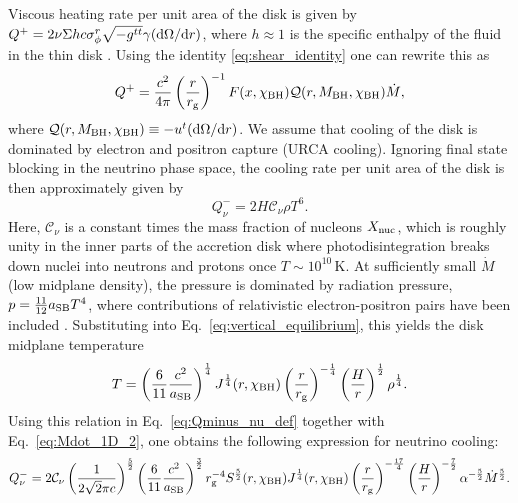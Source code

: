 Viscous heating rate per unit area of the disk is given by $Q^+ = 2\nu\Sigma h c \sigma^r_\phi \sqrt{-g^{tt}}\gamma ({\rm d}\Omega/{\rm d}r)$, where $h\approx 1$ is the specific enthalpy of the fluid in the thin disk \cite{beloborodov_super-eddington_1998}. Using the identity \eqref{eq:shear_identity} one can rewrite this as
\begin{equation}
	Q^+ = \frac{c^2}{4\pi}\left(\frac{r}{r_{\rm g}}\right)^{-1} F(x,\chi_{\rm BH}) \mathcal{Q}(r,M_{\rm BH},\chi_{\rm BH}) \dot{M}, \label{eq:Qplus}
\end{equation}
where $\mathcal{Q}(r,M_{\rm BH},\chi_{\rm BH})\equiv -u^t ({\rm d}\Omega/{\rm d}r)$. We assume that cooling of the disk is dominated by electron and positron capture (URCA cooling). Ignoring final state blocking in the neutrino phase space, the cooling rate per unit area of the disk is then approximately given by \cite{tubbs_neutrino_1975,Bruenn:1985en,qian_nucleosynthesis_1996,popham_hyperaccreting_1999}
\begin{equation}
	Q^-_\nu = 2H \mathcal{C}_\nu \rho T^6. \label{eq:Qminus_nu_def}
\end{equation}
Here, $\mathcal{C}_\nu$ is a constant times the mass fraction of nucleons $X_{\rm nuc}$, which is roughly unity in the inner parts of the accretion disk where photodisintegration breaks down nuclei into neutrons and protons once $T\sim 10^{10}$\,K. At sufficiently small $\dot{M}$ (low midplane density), the pressure is dominated by radiation pressure, $p = \frac{11}{12}a_{\rm SB} T^4$, where contributions of relativistic electron-positron pairs have been included \cite{popham_hyperaccreting_1999}. Substituting into Eq.~\eqref{eq:vertical_equilibrium}, this yields the disk midplane temperature
\begin{equation}
	T = \left(\frac{6}{11}\frac{c^2}{a_{\rm SB}}\right)^{\frac{1}{4}} J^{\frac{1}{4}}(r,\chi_{\rm BH}) \left(\frac{r}{r_{\rm g}}\right)^{-\frac{1}{4}} \left(\frac{H}{r}\right)^{\frac{1}{2}} \rho^{\frac{1}{4}}. \label{eq:T_1D}
\end{equation}
Using this relation in Eq.~\eqref{eq:Qminus_nu_def} together with Eq.~\eqref{eq:Mdot_1D_2}, one obtains the following expression for neutrino cooling:
\begin{equation}
	Q^-_\nu = 2 \mathcal{C}_\nu \left(\frac{1}{2\sqrt{2}\pi c}\right)^{\frac{5}{2}} \left(\frac{6}{11}\frac{c^2}{a_{\rm SB}}\right)^{\frac{3}{2}} r_{\rm g}^{-4} S^{\frac{5}{2}}(r,\chi_{\rm BH}) J^{\frac{1}{4}}(r,\chi_{\rm BH}) \left(\frac{r}{r_{\rm g}}\right)^{-\frac{17}{4}}\left(\frac{H}{r}\right)^{-\frac{7}{2}} \alpha^{-\frac{5}{2}}\dot{M}^{\frac{5}{2}}. \label{eq:Qminus_nu}
\end{equation}

